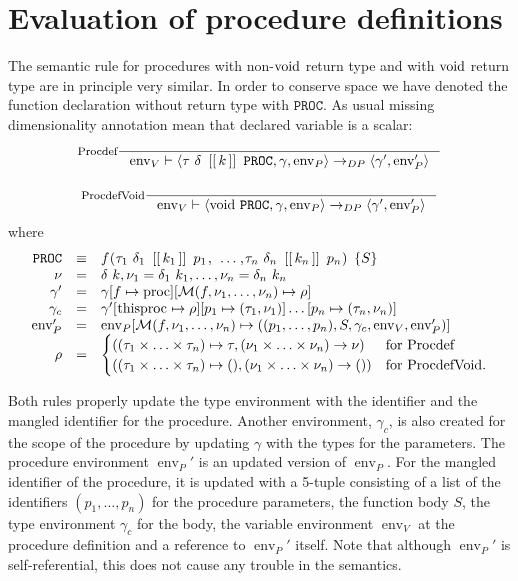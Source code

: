 \documentclass[a4paper, 10pt, draft]{report}
\DeclareMathOperator*{\env}{env}
\newcommand{\mycode}[1]{\ensuremath{\mbox{\lstinline{#1}}}}
\begin{document}
\section{Evaluation of procedure definitions}\label{sec:semantics:expr:procdefs}

The semantic rule for procedures with non-\mycode{void} return type and with
\mycode{void} return type are in principle very similar. In order to conserve
space we have denoted the function declaration without return type with
$\mathtt{PROC}$. As usual missing dimensionality annotation mean that
declared variable is a scalar:
\[\begin{array}{c}
\inference[Procdef]{}{
  \env_V |- \left< \tau\ \delta\ \mycode{[[}k\mycode{]]}\ \mathtt{PROC}, \gamma, \env_P \right> \to_{DP} \left< \gamma', \env'_P \right>
}\\[2em]
\inference[ProcdefVoid]{}{
  \env_V |- \left< \mycode{void}\ \mathtt{PROC}, \gamma, \env_P \right> \to_{DP} \left< \gamma', \env'_P \right>
}\end{array}\]
where \[\begin{array}{rcl}
\mathtt{PROC} & \equiv & f\mycode{(} \tau_1\ \delta_1\ \mycode{[[}k_1\mycode{]]}\ p_1 \mycode{,}\  \ldots \mycode{,}
                                     \tau_n\ \delta_n\ \mycode{[[}k_n\mycode{]]}\ p_n \mycode{) \{} S \mycode{\}} \\
    \nu & = & \delta\ k, \nu_1  = \delta_1\ k_1, \ldots, \nu_n = \delta_n\ k_n \\
\gamma' & = & \gamma[f \mapsto \mycode{proc}][\mathcal{M}(f,\nu_1,\ldots,\nu_n) \mapsto \rho] \\
  \gamma_c & = & \gamma'[\mycode{thisproc} \mapsto \rho][p_1 \mapsto (\tau_1, \nu_1)]\ldots[p_n \mapsto (\tau_n, \nu_n)] \\
  \env'_P & = & \env_P[\mathcal{M}(f, \nu_1, \ldots, \nu_n) \mapsto ( (p_1,\ldots,p_n), S, \gamma_c, \env_V, \env'_P)] \\
  \rho & = & \begin{cases}
    ( (\tau_1 \times \ldots \times \tau_n)\mapsto\tau, (\nu_1\times\ldots\times\nu_n)\to\nu) & \text{for Procdef} \\
    ( (\tau_1 \times \ldots \times \tau_n)\mapsto(), (\nu_1\times\ldots\times\nu_n)\to()) & \text{for ProcdefVoid}.
  \end{cases}
\end{array} \]

Both rules properly update the type environment with the identifier and the
mangled identifier for the procedure. Another environment, $\gamma_c$, is also
created for the scope of the procedure by updating $\gamma$ with the types for
the parameters. The procedure environment $\operatorname{env}_P'$ is an updated
version of $\operatorname{env}_P$. For the mangled identifier of the procedure,
it is updated with a 5-tuple consisting of a list of the identifiers $\left(
p_1, \ldots, p_n \right)$ for the procedure parameters, the function body $S$,
the type environment $\gamma_c$ for the body, the variable environment
$\operatorname{env}_V$ at the procedure definition and a reference to
$\operatorname{env}_P'$ itself. Note that although $\operatorname{env}_P'$ is
self-referential, this does not cause any trouble in the semantics.
\end{document}
